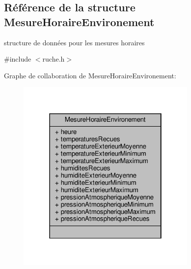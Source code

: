 \hypertarget{struct_mesure_horaire_environement}{}\subsection{Référence de la structure Mesure\+Horaire\+Environement}
\label{struct_mesure_horaire_environement}


structure de données pour les mesures horaires  




{\ttfamily \#include $<$ruche.\+h$>$}



Graphe de collaboration de Mesure\+Horaire\+Environement\+:\nopagebreak
\begin{figure}[H]
\begin{center}
\leavevmode
\includegraphics[width=250pt]{struct_mesure_horaire_environement__coll__graph}
\end{center}
\end{figure}
